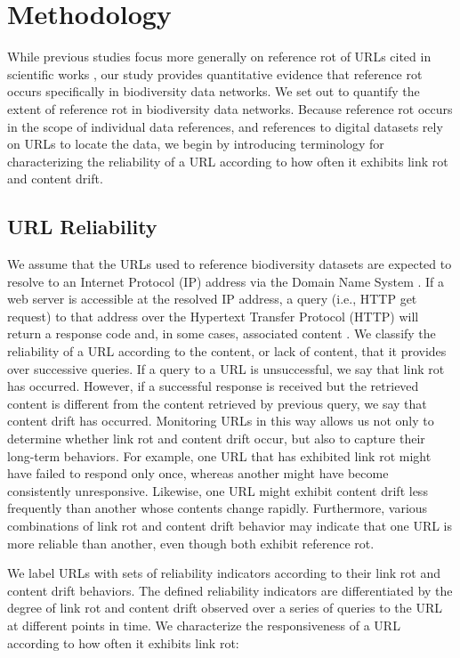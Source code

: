\section*{Methodology}
While previous studies focus more generally on reference rot of URLs cited in scientific works \citep{Vision_2010,Klein_2014}, our study provides quantitative evidence that reference rot occurs specifically in biodiversity data networks. We set out to quantify the extent of reference rot in biodiversity data networks. Because reference rot occurs in the scope of individual data references, and references to digital datasets rely on URLs to locate the data, we begin by introducing terminology for characterizing the reliability of a URL according to how often it exhibits link rot and content drift.

\subsection*{URL Reliability}
We assume that the URLs used to reference biodiversity datasets are expected to resolve to an Internet Protocol (IP) \citep{rfc791} address via the Domain Name System \citep{rfc1034}. If a web server is accessible at the resolved IP address, a query (i.e., HTTP get request) to that address over the Hypertext Transfer Protocol (HTTP) will return a response code and, in some cases, associated content \citep{rfc3986}. We classify the reliability of a URL according to the content, or lack of content, that it provides over successive queries. If a query to a URL is unsuccessful, we say that link rot has occurred. However, if a successful response is received but the retrieved content is different from the content retrieved by previous query, we say that content drift has occurred. Monitoring URLs in this way allows us not only to determine whether link rot and content drift occur, but also to capture their long-term behaviors. For example, one URL that has exhibited link rot might have failed to respond only once, whereas another might have become consistently unresponsive. Likewise, one URL might exhibit content drift less frequently than another whose contents change rapidly. Furthermore, various combinations of link rot and content drift behavior may indicate that one URL is more reliable than another, even though both exhibit reference rot.

We label URLs with sets of reliability indicators according to their link rot and content drift behaviors. The defined reliability indicators are differentiated by the degree of link rot and content drift observed over a series of queries to the URL at different points in time. We characterize the responsiveness of a URL according to how often it exhibits link rot:

